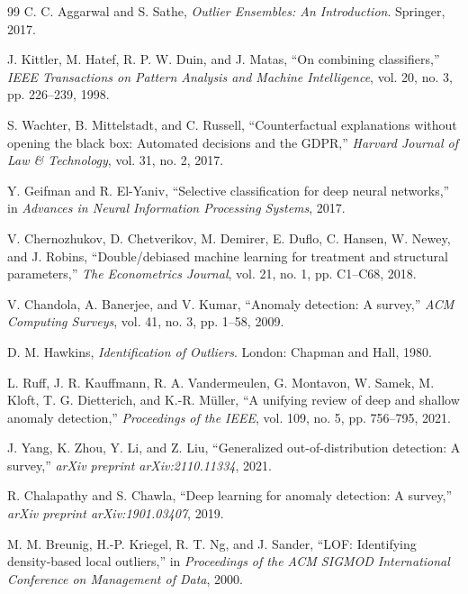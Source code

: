 \documentclass[10pt,conference]{IEEEtran}
\begin{document}
\begin{thebibliography}{99}
C. C. Aggarwal and S. Sathe, \emph{Outlier Ensembles: An Introduction}.
Springer, 2017.

J. Kittler, M. Hatef, R. P. W. Duin, and J. Matas, ``On combining
classifiers,'' \emph{IEEE Transactions on Pattern Analysis and Machine
Intelligence}, vol. 20, no. 3, pp. 226--239, 1998.

S. Wachter, B. Mittelstadt, and C. Russell, ``Counterfactual explanations
without opening the black box: Automated decisions and the GDPR,''
\emph{Harvard Journal of Law \& Technology}, vol. 31, no. 2, 2017.

Y. Geifman and R. El-Yaniv, ``Selective classification for deep neural
networks,'' in \emph{Advances in Neural Information Processing Systems}, 2017.

V. Chernozhukov, D. Chetverikov, M. Demirer, E. Duflo, C. Hansen, W. Newey,
and J. Robins, ``Double/debiased machine learning for treatment and
structural parameters,'' \emph{The Econometrics Journal}, vol. 21, no. 1,
pp. C1--C68, 2018.

V. Chandola, A. Banerjee, and V. Kumar, ``Anomaly detection: A survey,''
\emph{ACM Computing Surveys}, vol. 41, no. 3, pp. 1--58, 2009.

D. M. Hawkins, \emph{Identification of Outliers}. London: Chapman and Hall,
1980.

L. Ruff, J. R. Kauffmann, R. A. Vandermeulen, G. Montavon, W. Samek,
M. Kloft, T. G. Dietterich, and K.-R. M\"uller, ``A unifying review of deep
and shallow anomaly detection,'' \emph{Proceedings of the IEEE}, vol. 109,
no. 5, pp. 756--795, 2021.

J. Yang, K. Zhou, Y. Li, and Z. Liu, ``Generalized out-of-distribution
detection: A survey,'' \emph{arXiv preprint arXiv:2110.11334}, 2021.

R. Chalapathy and S. Chawla, ``Deep learning for anomaly detection: A
survey,'' \emph{arXiv preprint arXiv:1901.03407}, 2019.

M. M. Breunig, H.-P. Kriegel, R. T. Ng, and J. Sander, ``LOF: Identifying
density-based local outliers,'' in \emph{Proceedings of the ACM SIGMOD
International Conference on Management of Data}, 2000.


\end{thebibliography}
\end{document}
